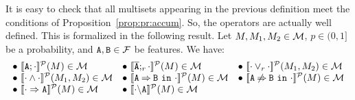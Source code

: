 

It is easy to check that all multisets appearing in the previous
definition meet the conditions of Proposition~\ref{prop:pr:accum}. So,
the operators are actually well defined. This is formalized in the
following result.
\bprop\label{prp:domain:prob}
  Let  $M,M_{1}, M_{2}\in{\cal M}$,
  $p\in(0,1]$ be a probability, and
  $\mathtt{A},\mathtt{B}\in{\cal F}$ be features. We have:
$$ \begin{array}{lll}
\bullet\ \semdenp{\feature{A};\cdot}(M)\in\calM &
\bullet\ \semdenp{\ofeature{A};_{r}\cdot}(M)\in\calM&
\bullet\ \semdenp{\cdot\choice_{r}\cdot}(M_{1},M_{2})\in\calM\\
\bullet\ \semdenp{\cdot\paral\cdot}(M_{1},M_{2})\in\calM&
\bullet\ \semdenp{\require{A}{B}{\cdot}}(M)\in\calM&
\bullet\ \semdenp{\exclude{A}{B}{\cdot}}(M)\in\calM\\
\bullet\ \semdenp{\mandatory{A}{\cdot}}(M)\in\calM&
\bullet\ \semdenp{\forbid{A}{\cdot}}(M)\in\calM
  \end{array}$$
\eprop





